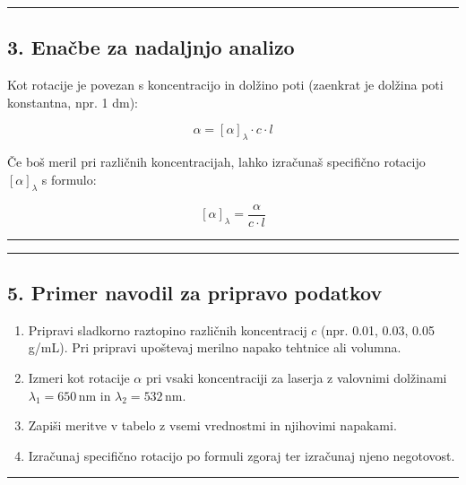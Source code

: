\documentclass[11pt]{article}
\providecommand{\tightlist}{%
      \setlength{\itemsep}{0pt}\setlength{\parskip}{0pt}}
\begin{document}
\begin{center}\rule{0.5\linewidth}{0.5pt}\end{center}

\hypertarget{enaux10dbe-za-nadaljnjo-analizo}{%
\subsection{3. Enačbe za nadaljnjo
analizo}\label{enaux10dbe-za-nadaljnjo-analizo}}

Kot rotacije je povezan s koncentracijo in dolžino poti (zaenkrat je
dolžina poti konstantna, npr. 1 dm):

\[
\alpha = [\alpha]_\lambda \cdot c \cdot l
\]

Če boš meril pri različnih koncentracijah, lahko izračunaš specifično
rotacijo \([\alpha]_\lambda\) s formulo:

\[
[\alpha]_\lambda = \frac{\alpha}{c \cdot l}
\]

\begin{center}\rule{0.5\linewidth}{0.5pt}\end{center}

\begin{center}\rule{0.5\linewidth}{0.5pt}\end{center}

\hypertarget{primer-navodil-za-pripravo-podatkov}{%
\subsection{5. Primer navodil za pripravo
podatkov}\label{primer-navodil-za-pripravo-podatkov}}

\begin{enumerate}
\def\labelenumi{\arabic{enumi}.}
\tightlist
\item
  Pripravi sladkorno raztopino različnih koncentracij \(c\) (npr. 0.01,
  0.03, 0.05 g/mL). Pri pripravi upoštevaj merilno napako tehtnice ali
  volumna.
\item
  Izmeri kot rotacije \(\alpha\) pri vsaki koncentraciji za laserja z
  valovnimi dolžinami \(\lambda_1 = 650\, \mathrm{nm}\) in
  \(\lambda_2 = 532\, \mathrm{nm}\).
\item
  Zapiši meritve v tabelo z vsemi vrednostmi in njihovimi napakami.
\item
  Izračunaj specifično rotacijo po formuli zgoraj ter izračunaj njeno
  negotovost.
\end{enumerate}

\begin{center}\rule{0.5\linewidth}{0.5pt}\end{center}
\end{document}
